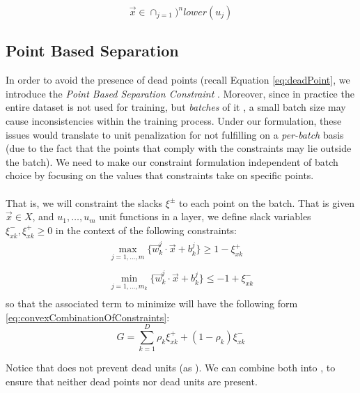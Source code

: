 \begin{equation}\label{eq:deadPoint}
 \vec{x}\in \displaystyle\cap_{j=1})^n lower(u_j)
\end{equation}

\subsection{Point Based Separation \SepPoint}\label{subsec:sepPoint}

In order to avoid the presence of dead points (recall Equation \ref{eq:deadPoint}, we introduce the \emph{Point Based Separation Constraint} \SepPoint. Moreover, since in practice the entire dataset is not used for training, but \emph{batches} of it \cite{LeCun06atutorial}, a small batch size may cause inconsistencies within the training process. Under our formulation,  these issues would translate to unit penalization for not fulfilling \SepUnit on a \emph{per-batch} basis (due to the fact that the points that comply with the constraints may lie outside the batch).  We need to make our constraint formulation independent of batch choice by focusing on the values that constraints take on specific points. 
\\\\
That is, we will constraint the slacks $\xi^{\pm}$ to each point on the batch. That is given $\vec{x}\in X$, and $u_1,\ldots,u_m$ unit functions in a layer, we define slack variables $\xi^{-}_{xk},\xi^{+}_{xk}\geq 0$ in the context of the following constraints:
\begin{equation}\label{eq:pointSeparationConstraint}
\begin{array}{lcl}
    \displaystyle\max_{j=1,\ldots,m}\{\vec{w}^j_k\cdot\vec{x}+b^j_k\}\geq 1-\xi^{+}_{xk}\\\\
    \displaystyle\min_{j=1,\ldots,m_k}\{\vec{w}^j_k\cdot\vec{x}+b^j_k\}\leq -1+\xi^{-}_{xk}\\
\end{array}    
\end{equation}
so that the associated term to minimize will have the following form \ref{eq:convexCombinationOfConstraints}:
\begin{equation}\label{eq:convexCombinationOfConstraints}
    G = \sum_{k=1}^{D}\rho_{k}\xi^{+}_{xk}+(1-\rho_{k})\xi^{-}_{xk}
\end{equation}

Notice that \SepPoint does not prevent  dead units (as \SepUnit). We can combine both into \SepUnitPoint, to ensure that neither dead points nor dead units are present. 

